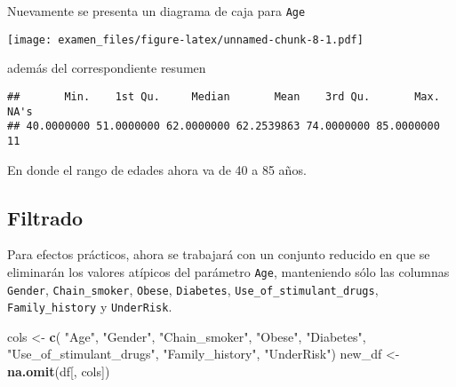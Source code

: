 \documentclass[
  10pt,
  spanish,
]{article}
\newenvironment{Shaded}{\begin{snugshade}}{\end{snugshade}}
\newcommand{\DataTypeTok}[1]{\textcolor[rgb]{0.13,0.29,0.53}{#1}}
\newcommand{\KeywordTok}[1]{\textcolor[rgb]{0.13,0.29,0.53}{\textbf{#1}}}
\newcommand{\NormalTok}[1]{#1}
\newcommand{\OperatorTok}[1]{\textcolor[rgb]{0.81,0.36,0.00}{\textbf{#1}}}
\newcommand{\StringTok}[1]{\textcolor[rgb]{0.31,0.60,0.02}{#1}}
\begin{document}
Nuevamente se presenta un diagrama de caja para \texttt{Age}

\begin{Shaded}
\end{Shaded}

\texttt{[image: examen\_files/figure-latex/unnamed-chunk-8-1.pdf]}

además del correspondiente resumen

\begin{Shaded}
\end{Shaded}

\begin{verbatim}
##       Min.    1st Qu.     Median       Mean    3rd Qu.       Max.       NA's 
## 40.0000000 51.0000000 62.0000000 62.2539863 74.0000000 85.0000000         11
\end{verbatim}

En donde el rango de edades ahora va de 40 a 85 años.

\hypertarget{filtrado}{%
\subsection{Filtrado}\label{filtrado}}

Para efectos prácticos, ahora se trabajará con un conjunto reducido en
que se eliminarán los valores atípicos del parámetro \texttt{Age},
manteniendo sólo las columnas \texttt{Gender}, \texttt{Chain\_smoker},
\texttt{Obese}, \texttt{Diabetes}, \texttt{Use\_of\_stimulant\_drugs},
\texttt{Family\_history} y \texttt{UnderRisk}.

\begin{Shaded}
\begin{Highlighting}[]
\NormalTok{cols \textless{}{-}}\StringTok{ }\KeywordTok{c}\NormalTok{(}
    \StringTok{"Age"}\NormalTok{, }\StringTok{"Gender"}\NormalTok{, }\StringTok{"Chain\_smoker"}\NormalTok{, }\StringTok{"Obese"}\NormalTok{,}
    \StringTok{"Diabetes"}\NormalTok{, }\StringTok{"Use\_of\_stimulant\_drugs"}\NormalTok{,}
    \StringTok{"Family\_history"}\NormalTok{, }\StringTok{"UnderRisk"}\NormalTok{)}
\NormalTok{new\_df \textless{}{-}}\StringTok{ }\KeywordTok{na.omit}\NormalTok{(df[, cols])}
\end{Highlighting}
\end{Shaded}
\end{document}

